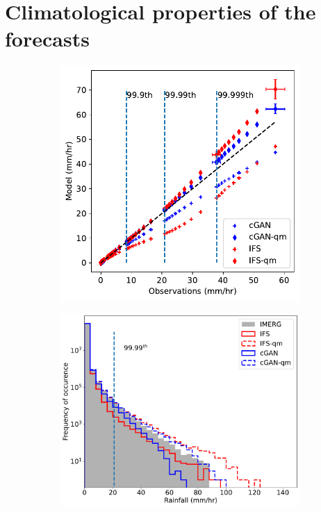 \documentclass[../main.tex]{subfiles}
\begin{document}
\section{Climatological properties of the forecasts}
\label{sec:climatologic}
\begin{figure}[!ht]
     \centering
     \begin{subfigure}[h]{0.45\textwidth}
         \includegraphics[width=\textwidth]{images/quantiles_total_final-nologs_217600.pdf}
         \caption{}
         \centering
     \end{subfigure}
     \hfill
     \begin{subfigure}[h]{0.5\textwidth}
         \includegraphics[width=\textwidth]{images/histograms_final-nologs_217600.pdf}

\end{subfigure}
\end{figure}
\end{document}
